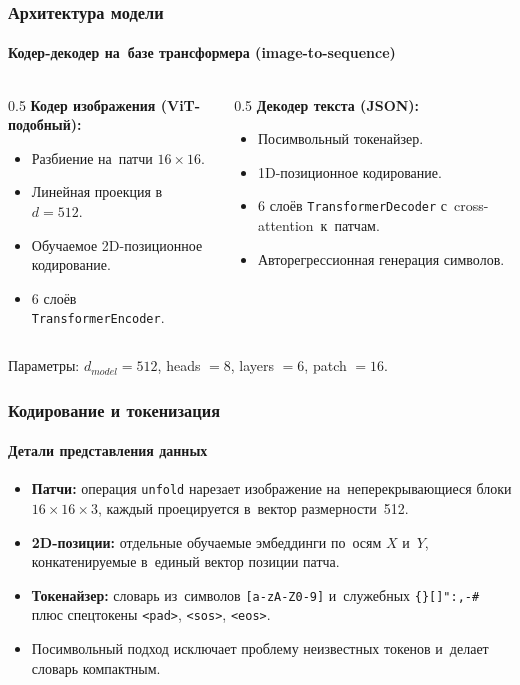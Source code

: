\documentclass{beamer}
\begin{document}
\begin{frame}
\frametitle{Архитектура модели}
\framesubtitle{Кодер-декодер на~базе трансформера (image-to-sequence)}
\begin{columns}
\begin{column}{0.5\textwidth}
\textbf{Кодер изображения (ViT\footnotemark-подобный):}
\begin{itemize}
  \item Разбиение на~патчи $16\times16$.
  \item Линейная проекция в~$d=512$.
  \item Обучаемое 2D-позиционное кодирование.
  \item $6$ слоёв \texttt{TransformerEncoder}.
\end{itemize}
\end{column}
\begin{column}{0.5\textwidth}
\textbf{Декодер текста (JSON):}
\begin{itemize}
  \item Посимвольный токенайзер.
  \item 1D-позиционное кодирование.
  \item $6$ слоёв \texttt{TransformerDecoder} с~cross-attention\footnotemark\ к~патчам.
  \item Авторегрессионная генерация символов.
\end{itemize}
\end{column}
\end{columns}
\addtocounter{footnote}{-1}%
%
%
%
\smallskip
\centering
\small Параметры: $d_{model}=512$, \quad heads $=8$, \quad layers $=6$, \quad patch $=16$.
\end{frame}

\begin{frame}[fragile]
\frametitle{Кодирование и токенизация}
\framesubtitle{Детали представления данных}
\begin{itemize}
  \item \textbf{Патчи:} операция \texttt{unfold} нарезает изображение на~неперекрывающиеся блоки $16\times16\times3$, каждый проецируется в~вектор размерности~512.
  \item \textbf{2D-позиции:} отдельные обучаемые эмбеддинги по~осям $X$ и~$Y$, конкатенируемые в~единый вектор позиции патча.
  \item \textbf{Токенайзер:} словарь из~символов \texttt{[a-zA-Z0-9]} и~служебных \verb|{}[]":,-#| плюс спецтокены \texttt{<pad>}, \texttt{<sos>}, \texttt{<eos>}.
  \item Посимвольный подход исключает проблему неизвестных токенов и~делает словарь компактным.
\end{itemize}
\end{frame}
\end{document}
